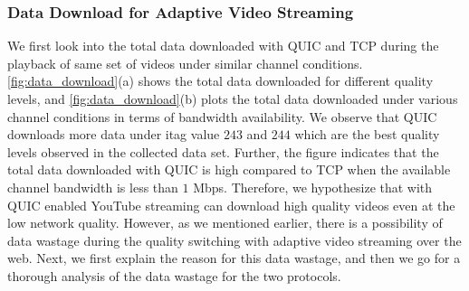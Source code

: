 \subsubsection{Data Download for Adaptive Video Streaming}
We first look into the total data downloaded with \ac{QUIC} and \ac{TCP} during the playback of same set of videos under similar channel conditions. \fig\ref{fig:data_download}(a) shows the total data downloaded for different quality levels, and \fig\ref{fig:data_download}(b) plots the total data downloaded under various channel conditions in terms of bandwidth availability. We observe that \ac{QUIC} downloads more data under itag value $243$ and $244$ which are the best quality levels observed in the collected data set. 
Further, the figure indicates that the total data downloaded with \ac{QUIC} is high compared to \ac{TCP} when the available channel bandwidth is less than $1$ Mbps. Therefore, we hypothesize that with \ac{QUIC} enabled YouTube streaming can download high quality videos even at the low network quality. 
However, as we mentioned earlier, there is a possibility of data wastage during the quality switching with adaptive video streaming over the web. Next, we first explain the reason for this data wastage, and then we go for a thorough analysis of the data wastage for the two protocols. 





